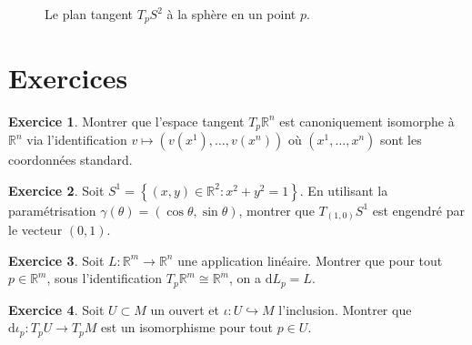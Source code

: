 \documentclass[12pt,a4paper,openany]{book}
\theoremstyle{definition}
\newtheorem{exercice}{Exercice}[chapter]
\theoremstyle{plain}
\theoremstyle{remark}
\newcommand{\R}{\mathbb{R}}
\newcommand{\dd}{\mathrm{d}}
\newcommand{\set}[1]{\left\{#1\right\}}
\begin{document}
\begin{figure}[ht]
\centering
{}
\caption{Le plan tangent $T_pS^2$ à la sphère en un point $p$.}\label{fig:plan-tangent-S2}
\end{figure}

\section{Exercices}\label{sec:exo-ch3}

\begin{exercice}\label{exo:tangent-Rn}
Montrer que l'espace tangent $T_p\R^n$ est canoniquement isomorphe à $\R^n$
via l'identification $v \mapsto (v(x^1), \ldots, v(x^n))$ où $(x^1, \ldots, x^n)$
sont les coordonnées standard.
\end{exercice}

\begin{exercice}\label{exo:tangent-S1}
Soit $S^1 = \set{(x,y) \in \R^2 : x^2 + y^2 = 1}$.
En utilisant la paramétrisation $\gamma(\theta) = (\cos\theta, \sin\theta)$,
montrer que $T_{(1,0)}S^1$ est engendré par le vecteur $(0,1)$.
\end{exercice}

\begin{exercice}\label{exo:diff-lineaire}
Soit $L : \R^m \to \R^n$ une application linéaire. Montrer que pour tout
$p \in \R^m$, sous l'identification $T_p\R^m \cong \R^m$, on a $\dd L_p = L$.
\end{exercice}

\begin{exercice}\label{exo:diff-inclusion}
Soit $U \subset M$ un ouvert et $\iota : U \hookrightarrow M$ l'inclusion.
Montrer que $\dd\iota_p : T_pU \to T_pM$ est un isomorphisme pour tout $p \in U$.
\end{exercice}
\end{document}
